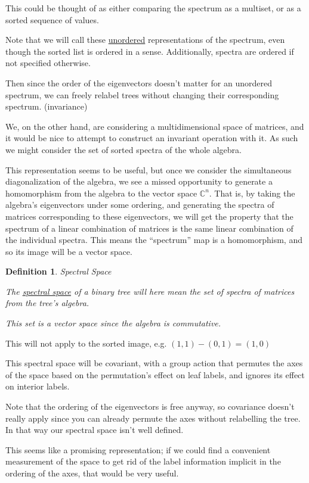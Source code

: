 \documentclass[10pt,a4paper]{report}
\newcommand{\C}{\mathbb{C}}
\newtheorem{definition}{Definition}
\begin{document}
This could be thought of as either comparing the spectrum as a multiset, or as
a sorted sequence of values.

Note that we will call these \underline{unordered} representations of the spectrum, even though the sorted list is ordered in a sense. Additionally, spectra are ordered if not specified otherwise.

Then since the order of the eigenvectors doesn't matter for an unordered spectrum, we can freely relabel
trees without changing their corresponding spectrum. (invariance)

We, on the other hand, are considering a multidimensional space of matrices,
and it would be nice to attempt to construct an invariant operation with it.
As such we might consider the set of sorted spectra of the whole algebra.

This representation seems to be useful, but once we consider the simultaneous
diagonalization of the algebra, we see a missed opportunity to generate a
homomorphism from the algebra to the vector space $\C^n$.
That is, by taking the algebra's eigenvectors under some ordering, and
generating the spectra of matrices corresponding to these eigenvectors, we will
get the property that the spectrum of a linear combination of matrices is the
same linear combination of the individual spectra.
This means the ``spectrum'' map is a homomorphism, and so its image will be a
vector space.

\begin{definition}Spectral Space

	The \underline{spectral space} of a binary tree will here mean the set of spectra of
	matrices from the tree's algebra.

	This set is a vector space since the algebra is commutative.
\end{definition}


This will not apply to the sorted image, e.g. $(1, 1) - (0, 1) = (1, 0)$

This spectral space will be covariant, with a group action that permutes the axes of the space based on the permutation's effect on leaf labels, and ignores its effect on interior labels.

Note that the ordering of the eigenvectors is free anyway, so covariance doesn't really apply since you can already permute the axes without relabelling the tree.
In that way our spectral space isn't well defined.

This seems like a promising representation; if we could find a convenient
measurement of the space to get rid of the label information implicit in the ordering of the axes, that would be very
useful.
\end{document}
